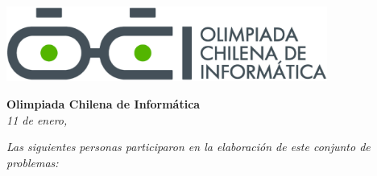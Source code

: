 \documentclass[12pt]{oci}
\begin{document}
\begin{center}
  \includegraphics[height=70pt]{logo.eps}

  \vskip 70pt
  \Large{\bf Olimpiada Chilena de Inform\'atica\\ \the\year}
  \vskip 10pt
  \large{\phase}
  \vskip 10pt
  \normalsize{\it 11 de enero, \the\year}

  \vskip 85pt

  \emph{Las siguientes personas participaron en la elaboración de este conjunto
    de problemas:}
  \vskip 10pt
\end{center}
\end{document}
